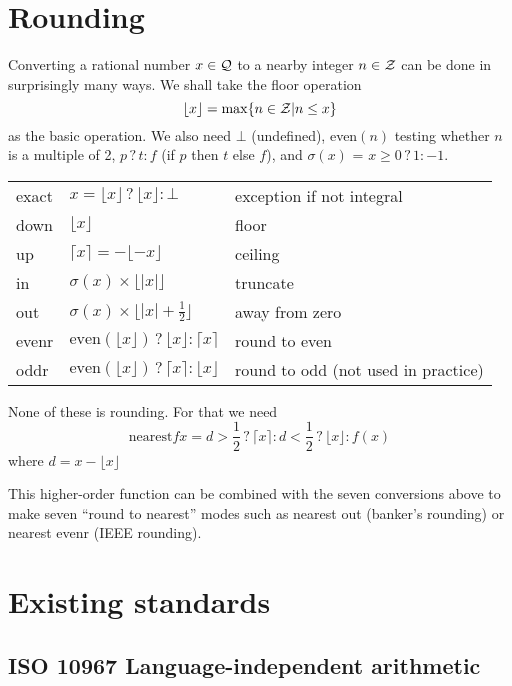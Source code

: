 \documentclass{article}
\begin{document}
\def\subI{${}_I$}
\def\subF{${}_F$}
\def\subD{${}_D$}
\def\ifso{\mathbin{?}}

\section{Rounding}

Converting a rational number $x \in {\cal Q}$ to a nearby
integer $n \in {\cal Z}$ can be done in surprisingly many
ways.  We shall take the floor operation
\[ \lfloor x \rfloor = \max \{n \in {\cal Z} | n \le x\} \]
as the basic operation.  We also need $\bot$ (undefined),
even$(n)$ testing whether $n$ is a multiple of 2,
$p \ifso t : f$ (if $p$ then $t$ else $f$), and $\sigma(x)$ =
$x\ge 0 \ifso 1 : -1$.

\begin{tabular}{lll}
exact & $x=\lfloor x\rfloor \ifso \lfloor x \rfloor : \bot$ &
        exception if not integral\\
down  & $\lfloor x \rfloor$             & floor\\
up    & $\lceil x \rceil = -\lfloor -x \rfloor$ & ceiling\\
in    & $\sigma(x)\times\lfloor|x|\rfloor$ & truncate\\
out   & $\sigma(x)\times\lfloor|x|+\frac12\rfloor$ & away from zero\\
evenr & $\mbox{even}(\lfloor x\rfloor) \ifso \lfloor x \rfloor
        : \lceil x \rceil$ & round to even\\
oddr  & $\mbox{even}(\lfloor x\rfloor) \ifso \lceil x \rceil
        : \lfloor x \rfloor$ & round to odd (not used in practice)
\end{tabular}

None of these is rounding.  For that we need
\[\mbox{nearest} f x = d > \frac12 \ifso \lceil x \rceil :
 d < \frac12 \ifso \lfloor x \rfloor : f(x) \]
\noindent where
$ d = x - \lfloor x \rfloor $

This higher-order function can be combined with the seven conversions
above to make seven ``round to nearest'' modes such as nearest out
(banker's rounding) or nearest evenr (IEEE rounding).

\section{Existing standards}

\subsection{ISO 10967 Language-independent arithmetic}
\end{document}
